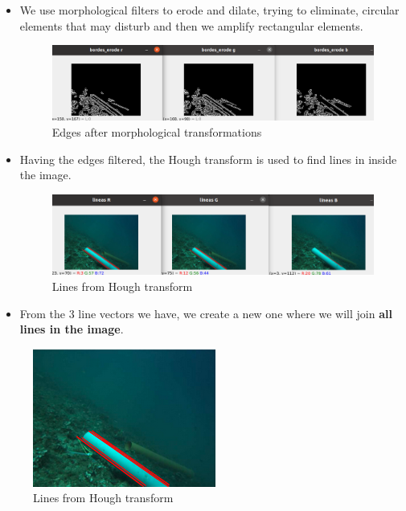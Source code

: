 \documentclass[12pt, a4paper]{article}
\begin{document}
\begin{itemize}
    \item We use morphological filters to erode and dilate, trying to eliminate,
    circular elements that may disturb and then we amplify rectangular elements.

    \begin{figure}[H]
        \centering
        \includegraphics[scale=0.3]{images_doc/bordes_erode.png}
        \caption{Edges after morphological transformations}
        \label{fig:erodes}
    \end{figure}



    \item Having the edges filtered, the Hough transform is used to find lines in
    inside the image.

    \begin{figure}[H]
        \centering
        \includegraphics[scale=0.3]{images_doc/lineas_separada.png}
        \caption{Lines from Hough transform}
        \label{fig:jiug}
    \end{figure}
    
    \item From the 3 line vectors we have, we create a new one where we will join
    \textbf{all lines in the image}.
    
\end{itemize}

\begin{figure}[H]
    \centering
    \includegraphics[scale=0.3]{images_doc/all_lines.png}
    \caption{Lines from Hough transform}
    \label{fig:jiiug}
\end{figure}
\end{document}
